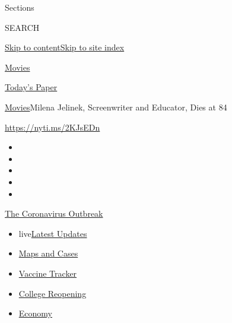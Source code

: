 Sections

SEARCH

\protect\hyperlink{site-content}{Skip to
content}\protect\hyperlink{site-index}{Skip to site index}

\href{https://www.nytimes3xbfgragh.onion/section/movies}{Movies}

\href{https://myaccount.nytimes3xbfgragh.onion/auth/login?response_type=cookie\&client_id=vi}{}

\href{https://www.nytimes3xbfgragh.onion/section/todayspaper}{Today's
Paper}

\href{/section/movies}{Movies}\textbar{}Milena Jelinek, Screenwriter and
Educator, Dies at 84

\url{https://nyti.ms/2KJsEDn}

\begin{itemize}
\item
\item
\item
\item
\item
\end{itemize}

\href{https://www.nytimes3xbfgragh.onion/news-event/coronavirus?action=click\&pgtype=Article\&state=default\&region=TOP_BANNER\&context=storylines_menu}{The
Coronavirus Outbreak}

\begin{itemize}
\tightlist
\item
  live\href{https://www.nytimes3xbfgragh.onion/2020/08/04/world/coronavirus-covid-19.html?action=click\&pgtype=Article\&state=default\&region=TOP_BANNER\&context=storylines_menu}{Latest
  Updates}
\item
  \href{https://www.nytimes3xbfgragh.onion/interactive/2020/us/coronavirus-us-cases.html?action=click\&pgtype=Article\&state=default\&region=TOP_BANNER\&context=storylines_menu}{Maps
  and Cases}
\item
  \href{https://www.nytimes3xbfgragh.onion/interactive/2020/science/coronavirus-vaccine-tracker.html?action=click\&pgtype=Article\&state=default\&region=TOP_BANNER\&context=storylines_menu}{Vaccine
  Tracker}
\item
  \href{https://www.nytimes3xbfgragh.onion/2020/08/02/us/covid-college-reopening.html?action=click\&pgtype=Article\&state=default\&region=TOP_BANNER\&context=storylines_menu}{College
  Reopening}
\item
  \href{https://www.nytimes3xbfgragh.onion/live/2020/08/03/business/stock-market-today-coronavirus?action=click\&pgtype=Article\&state=default\&region=TOP_BANNER\&context=storylines_menu}{Economy}
\end{itemize}

